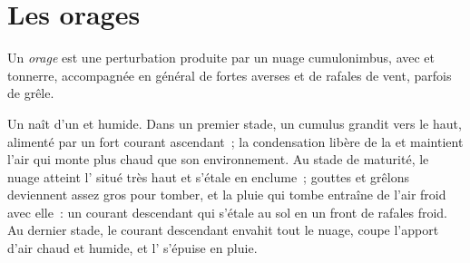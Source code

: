 \section{Les orages}

\begin{definition}[Orage]\label{def:g10:storms-and-cyclones:thunderstorm}
Un \emph{orage} est une perturbation produite par un nuage
cumulonimbus, avec  et tonnerre, accompagnée en général de fortes
averses et de rafales de vent, parfois de grêle.
\end{definition}

Un  naît d'un  et humide. Dans un premier stade, un cumulus
grandit vers le haut, alimenté par un fort courant ascendant~; la
condensation libère de la  et maintient l'air qui monte plus
chaud que son environnement. Au stade de maturité, le nuage atteint l' situé très haut et s'étale en enclume~; gouttes et grêlons
deviennent assez gros pour tomber, et la pluie qui tombe entraîne de l'air
froid avec elle~: un courant descendant qui s'étale au sol en un front de
rafales froid. Au dernier stade, le courant descendant envahit tout le
nuage, coupe l'apport d'air chaud et humide, et l' s'épuise en pluie.

